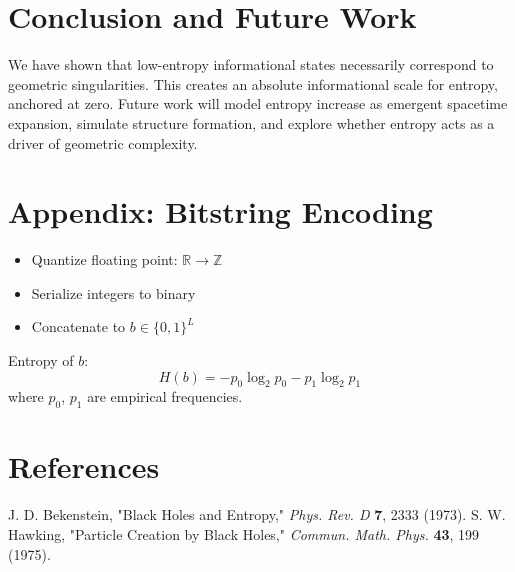 \documentclass[11pt]{article}
\begin{document}
\section{Conclusion and Future Work}

We have shown that low-entropy informational states necessarily correspond to geometric singularities. This creates an absolute informational scale for entropy, anchored at zero. Future work will model entropy increase as emergent spacetime expansion, simulate structure formation, and explore whether entropy acts as a driver of geometric complexity.

\appendix
\section{Appendix: Bitstring Encoding}

\begin{itemize}
  \item Quantize floating point: $\mathbb{R} \to \mathbb{Z}$
  \item Serialize integers to binary
  \item Concatenate to $b \in \{0,1\}^L$
\end{itemize}

Entropy of $b$:
\[
H(b) = -p_0 \log_2 p_0 - p_1 \log_2 p_1
\]
where $p_0$, $p_1$ are empirical frequencies.

\section*{References}
\begin{thebibliography}{9}
 J. D. Bekenstein, "Black Holes and Entropy," \textit{Phys. Rev. D} \textbf{7}, 2333 (1973).
 S. W. Hawking, "Particle Creation by Black Holes," \textit{Commun. Math. Phys.} \textbf{43}, 199 (1975).
\end{thebibliography}
\end{document}
